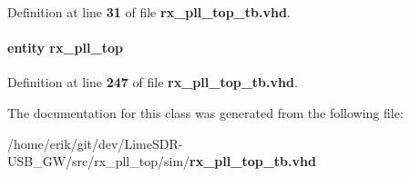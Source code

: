 Definition at line {\bf 31} of file {\bf rx\+\_\+pll\+\_\+top\+\_\+tb.\+vhd}.

\paragraph[{rx\+\_\+pll\+\_\+top\+\_\+dut0}]{ {\bfseries \textcolor{keywordflow}{entity}\textcolor{vhdlchar}{ }\textcolor{vhdlchar}{rx\+\_\+pll\+\_\+top}\textcolor{vhdlchar}{ }} \hspace{0.3cm}{\ttfamily [Instantiation]}}\label{classrx__pll__top__tb_1_1tb__behave_a71a1bc8d9b9b69b7704023de140c3571}


Definition at line {\bf 247} of file {\bf rx\+\_\+pll\+\_\+top\+\_\+tb.\+vhd}.



The documentation for this class was generated from the following file\+:\begin{DoxyCompactItemize}
\item 
/home/erik/git/dev/\+Lime\+S\+D\+R-\/\+U\+S\+B\+\_\+\+G\+W/src/rx\+\_\+pll\+\_\+top/sim/{\bf rx\+\_\+pll\+\_\+top\+\_\+tb.\+vhd}\end{DoxyCompactItemize}
